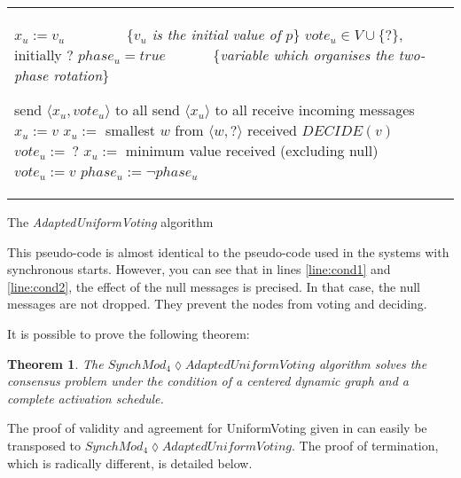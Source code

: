\documentclass{article}
\newtheorem{theorem}{Theorem}
\begin{document}
\begin{algorithm}[htb]
\begin{distribalgo}[1]
\begin{tabular}{ll}
\begin{minipage}{33em}


\INDENT{\textbf{Initialisation:}}
	\STATE $x_u := v_u$ ~~~~~~~~\{\emph{$v_u$ is the initial value of $p$}\}
	\STATE $vote_u \in V\cup\{ ? \}$, initially $?$
	\STATE $phase_u = true$ ~~~~~~\{\textit{variable which organises the two-phase rotation}\}

\ENDINDENT
\BLANK

\INDENT{\textbf{Round $r$:}}
	\IF{$phase_u$}
		\STATE send $\langle x_u , vote_u \rangle$ to all
	\ELSE
		\STATE send $\langle x_u \rangle$ to all
	\ENDIF
	\STATE receive incoming messages
	\IF{$phase_u$}
		\IF{a node voted for $v$}
			\STATE $x_u:= v$ \label{line:adopt_vote}
		\ELSE
			\STATE $x_u :=$ smallest  $w$ from  $\langle w , ? \rangle$ received \label{line:min_vote}
		\ENDIF
		\IF{every node voted for $v$, none sent null} \label{line:cond1}
			\STATE $DECIDE(v)$
		\ENDIF
		\STATE $vote_u :=\ ?$
	\ELSE
		\STATE $ x_u :=$ minimum value received (excluding null) \label{line:min_val}
		\IF{every node sent $v$, none sent null} \label{line:cond2}
			\STATE $vote_u := v$
		\ENDIF
	\ENDIF
	\STATE $phase_u := \neg phase_u$
\ENDINDENT

\end{minipage}
\end{tabular}

\caption{The {\em AdaptedUniformVoting} algorithm}
\label{unifvotfig}
\end{distribalgo}
\end{algorithm}

This pseudo-code is almost identical to the pseudo-code used in the systems with synchronous starts.
However, you can see that in lines \ref{line:cond1} and \ref{line:cond2}, the effect of the null messages is precised.
In that case, the null messages are not dropped. They prevent the nodes from voting and deciding.

It is possible to prove the following theorem:

\begin{theorem}
	The $SynchMod_4 \lozenge AdaptedUniformVoting$ algorithm solves the consensus problem under the condition of a centered dynamic graph and a complete activation schedule.
\end{theorem}

The proof of validity and agreement for UniformVoting given in \cite{CBS09} can easily be transposed to \newline $SynchMod_4 \lozenge AdaptedUniformVoting$.
The proof of termination, which is radically different, is detailed below.
\end{document}
